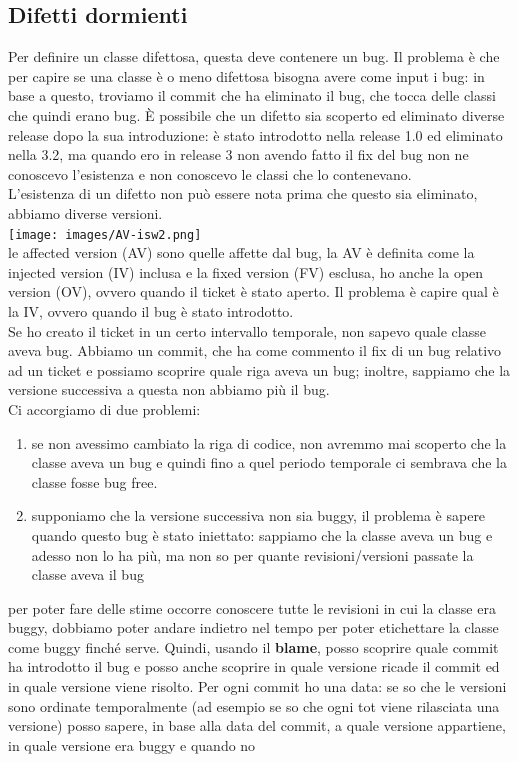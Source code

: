 \documentclass{article}
\begin{document}
\subsection{Difetti dormienti}
Per definire un classe difettosa, questa deve contenere un bug. Il problema è che per capire se una classe è o meno difettosa bisogna avere come input i bug: in base a questo, troviamo il commit che ha eliminato il bug, che tocca delle classi che quindi erano bug. È possibile che un difetto sia scoperto ed eliminato diverse release dopo la sua introduzione: è stato introdotto nella release 1.0 ed eliminato nella 3.2, ma quando ero in release 3 non avendo fatto il fix del bug non ne conoscevo l'esistenza e non conoscevo le classi che lo contenevano.\\ L'esistenza di un difetto non può essere nota prima che questo sia eliminato, abbiamo diverse versioni.\\
\texttt{[image: images/AV-isw2.png]}\\
le affected version (AV) sono quelle affette dal bug, la AV è definita come la injected version (IV) inclusa e la fixed version (FV) esclusa, ho anche la open version (OV), ovvero quando il ticket è stato aperto. Il problema è capire qual è la IV, ovvero quando il bug è stato introdotto.\\
Se ho creato il ticket in un certo intervallo temporale, non sapevo quale classe aveva bug. Abbiamo un commit, che ha come commento il fix di un bug relativo ad un ticket e possiamo scoprire quale riga aveva un bug; inoltre, sappiamo che la versione successiva a questa non abbiamo più il bug.\\ Ci accorgiamo di due problemi:
\begin{enumerate}
\item se non avessimo cambiato la riga di codice, non avremmo mai scoperto che la classe aveva un bug e quindi fino a quel periodo temporale ci sembrava che la classe fosse bug free.
\item supponiamo che la versione successiva non sia buggy, il problema è sapere quando questo bug è stato iniettato: sappiamo che la classe aveva un bug e adesso non lo ha più, ma non so per quante revisioni/versioni passate la classe aveva il bug
\end{enumerate}
per poter fare delle stime occorre conoscere tutte le revisioni in cui la classe era buggy, dobbiamo poter andare indietro nel tempo per poter etichettare la classe come buggy finché serve. Quindi, usando il \textbf{blame}, posso scoprire quale commit ha introdotto il bug e posso anche scoprire in quale versione ricade il commit ed in quale versione viene risolto. Per ogni commit ho una data: se so che le versioni sono ordinate temporalmente (ad esempio se so che ogni tot viene rilasciata una versione) posso sapere, in base alla data del commit, a quale versione appartiene, in quale versione era buggy e quando no
\end{document}
